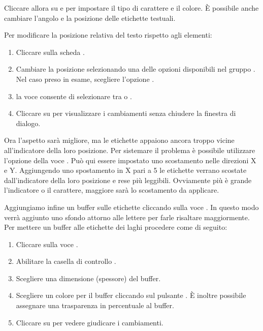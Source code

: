 Cliccare allora su  e 
per impostare il tipo di carattere e il colore. È possibile anche cambiare
l'angolo e la posizione delle etichette testuali.

Per modificare la posizione relativa del testo rispetto agli elementi:

\begin{enumerate} 
\item Cliccare sulla scheda .
\item Cambiare la posizione selezionando una delle opzioni disponibili nel
gruppo . Nel caso preso in esame, scegliere l'opzione
.
\item la voce  consente di
selezionare tra  o .
\item Cliccare su  per visualizzare i cambiamenti senza chiudere
la finestra di dialogo.
\end{enumerate} 

Ora l'aspetto sarà migliore, ma le etichette appaiono ancora troppo vicine
all'indicatore della loro posizione. Per sistemare il problema è possibile
utilizzare l'opzione della voce . Può qui essere impostato uno
scostamento nelle direzioni X e Y. Aggiungendo uno spostamento in X pari a 5
le etichette verrano scostate dall'indicatore della loro posizione e rese
più leggibili. Ovviamente più è grande l'indicatore o il carattere, maggiore
sarà lo scostamento da applicare.

Aggiungiamo infine un buffer sulle etichette cliccando sulla voce
. In questo modo verrà aggiunto uno sfondo attorno alle lettere
per farle risaltare maggiormente. Per mettere un buffer alle etichette dei
laghi procedere come di seguito:

\begin{enumerate}
\item Cliccare sulla voce .
\item Abilitare la casella di controllo .
\item Scegliere una dimensione (spessore) del buffer.
\item Scegliere un colore per il buffer cliccando sul pulsante
. È inoltre possibile assegnare una trasparenza in percentuale
al buffer.
\item Cliccare su  per vedere giudicare i cambiamenti.
\end{enumerate} 

